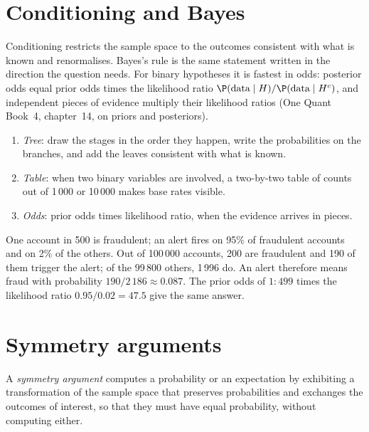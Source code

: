 \section{Conditioning and Bayes}

Conditioning restricts the sample space to the outcomes consistent with what is known and renormalises. Bayes's
rule is the same statement written in the direction the question needs. For binary hypotheses it is fastest in
odds: posterior odds equal prior odds times the likelihood ratio $\P(\text{data} \mid H)/\P(\text{data} \mid
H^c)$, and independent pieces of evidence multiply their likelihood ratios (One Quant Book~4, chapter~14, on
priors and posteriors).

\begin{method}\label{met:iv:probability-i:condition}
\begin{enumerate}
\item \emph{Tree}: draw the stages in the order they happen, write the probabilities on the branches, and add the
leaves consistent with what is known.
\item \emph{Table}: when two binary variables are involved, a two-by-two table of counts out of 1\,000 or
10\,000 makes base rates visible.
\item \emph{Odds}: prior odds times likelihood ratio, when the evidence arrives in pieces.
\end{enumerate}
\end{method}

\begin{example}\label{ex:iv:probability-i:bayes}
One account in 500 is fraudulent; an alert fires on 95\% of fraudulent accounts and on 2\% of the others. Out of
100\,000 accounts, 200 are fraudulent and 190 of them trigger the alert; of the 99\,800 others, 1\,996 do. An
alert therefore means fraud with probability $190/2\,186 \approx 0.087$. The prior odds of $1:499$ times the
likelihood ratio $0.95/0.02 = 47.5$ give the same answer.
\end{example}

\section{Symmetry arguments}

\begin{definition}\label{def:iv:probability-i:symmetry}
A \emph{symmetry argument} computes a probability or an expectation by exhibiting a
transformation of the sample space that preserves probabilities and exchanges the outcomes of interest, so that
they must have equal probability, without computing either.
\end{definition}

